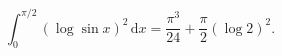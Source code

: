 %

\begin{problem}[pytanie 58654]
    \label{stack_58654}%
    \begin{equation}
        \int_0^{\pi/2} (\log \sin x)^2 \,\mathrm{d} x = \frac{\pi^3}{24} + \frac{\pi}{2} (\log 2)^2.
    \end{equation}
\end{problem}

%